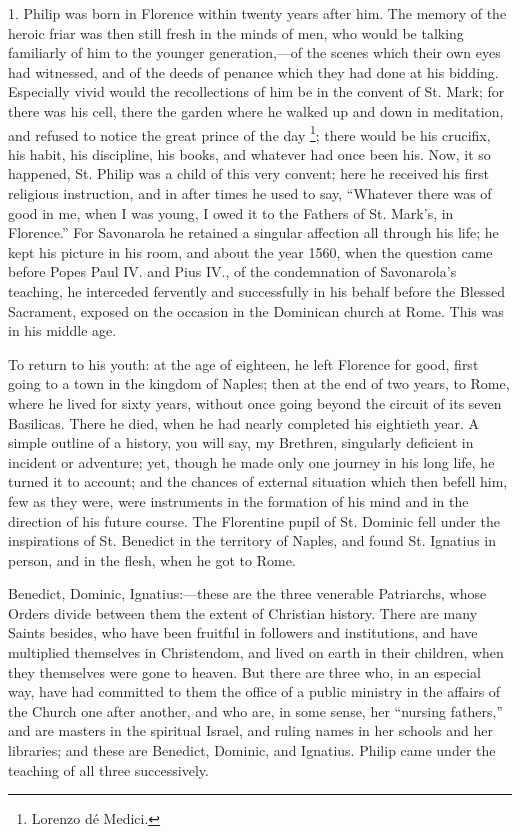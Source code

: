 1. Philip was born in Florence within twenty years
after him. The memory of the heroic friar was then still
fresh in the minds of men, who would be talking
familiarly of him to the younger generation,—of the
scenes which their own eyes had witnessed, and of the
deeds of penance which they had done at his bidding.
Especially vivid would the recollections of him be in the
convent of St. Mark; for there was his cell, there the
garden where he walked up and down in meditation, and
refused to notice the great prince of the day \footnote{Lorenzo dé Medici.};
there would be his crucifix, his habit, his discipline,
his books, and whatever had once been his. Now, it so
happened, St. Philip was a child of this very convent;
here he received his first religious instruction, and in
after times he used to say, ``Whatever there was of
good in me, when I was young, I owed it to the Fathers of
St. Mark's, in Florence.'' For Savonarola he retained
a singular affection all through his life; he kept his
picture in his room, and about the year 1560, when the
question came before Popes Paul IV. and Pius IV., of the
condemnation of Savonarola's teaching, he interceded
fervently and successfully in his behalf before the
Blessed Sacrament, exposed on the occasion in the
Dominican church at Rome. This was in his middle age.

To return to his youth: at the age of eighteen, he
left Florence for good, first going to a town in the
kingdom of Naples; then at the end of two years, to Rome,
where he lived for sixty years, without once going beyond
the circuit of its seven Basilicas. There he died, when
he had nearly completed his eightieth year. A simple
outline of a history, you will say, my Brethren,
singularly deficient in incident or adventure; yet,
though he made only one journey in his long life, he
turned it to account; and the chances of external
situation which then befell him, few as they were, were
instruments in the formation of his mind and in the
direction of his future course. The Florentine pupil of
St. Dominic fell under the inspirations of St. Benedict
in the territory of Naples, and found St. Ignatius in
person, and in the flesh, when he got to Rome.

Benedict, Dominic, Ignatius:—these are the three
venerable Patriarchs, whose Orders divide between them
the extent of Christian history. There are many Saints
besides, who have been fruitful in followers and
institutions, and have multiplied themselves in
Christendom, and lived on earth in their children, when
they themselves were gone to heaven. But there are three
who, in an especial way, have had committed to them the
office of a public ministry in the affairs of the Church
one after another, and who are, in some sense, her
``nursing fathers,'' and are masters in the
spiritual Israel, and ruling names in her schools and her
libraries; and these are Benedict, Dominic, and Ignatius.
Philip came under the teaching of all three successively.

